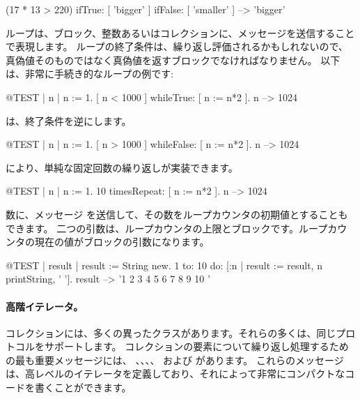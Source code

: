 \documentclass[a4paper,10pt,twoside]{book}
\begin{document}
\begin{code}{}
(17 * 13 > 220)
   ifTrue: [ 'bigger' ]
   ifFalse: [ 'smaller' ] --> 'bigger'
\end{code}

ループは、ブロック、整数あるいはコレクションに、メッセージを送信することで表現します。
ループの終了条件は、繰り返し評価されるかもしれないので、真偽値そのものではなく真偽値を返すブロックでなければなりません。
以下は、非常に手続き的なループの例です:

\begin{code}{@TEST | n |}
n := 1.
[ n < 1000 ] whileTrue: [ n := n*2 ].
n --> 1024
\end{code}

\noindent
{} は、終了条件を逆にします。
\begin{code}{@TEST | n |}
n := 1.
[ n > 1000 ] whileFalse: [ n := n*2 ].
n --> 1024
\end{code}

\noindent
{} により、単純な固定回数の繰り返しが実装できます。

\begin{code}{@TEST | n |}
n := 1.
10 timesRepeat: [ n := n*2 ].
n --> 1024
\end{code}

数に、メッセージ  を送信して、その数をループカウンタの初期値とすることもできます。
二つの引数は、ループカウンタの上限とブロックです。ループカウンタの現在の値がブロックの引数になります。

\begin{code}{@TEST | result |}
result := String new.
1 to: 10 do: [:n | result := result, n printString, ' '].
result --> '1 2 3 4 5 6 7 8 9 10 '
\end{code}


\paragraph{高階イテレータ。}
コレクションには、多くの異ったクラスがあります。それらの多くは、同じプロトコルをサポートします。
コレクションの要素について繰り返し処理するための最も重要メッセージには、
、、、、 および  があります。
これらのメッセージは、高レベルのイテレータを定義しており、それによって非常にコンパクトなコードを書くことができます。
\end{document}
